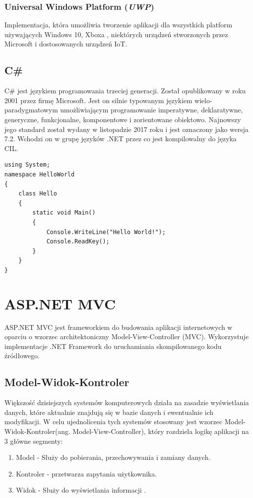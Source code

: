 \subsection{Universal Windows Platform (\textit{UWP})}
Implementacja, która umożliwia tworzenie aplikacji dla wszystkich platform używających Windows 10, Xboxa , niektórych urządzeń stworzonych przez Microsoft i dostosowanych urządzeń IoT.


\section{C\#}

C\# jest językiem programowania trzeciej generacji. Został opublikowany w roku 2001 przez firmę Microsoft. Jest on silnie typowanym językiem wielo-paradygmatowym umożliwiającym programowanie imperatywne, deklaratywne, generyczne, funkcjonalne, komponentowe i zorientowane obiektowo. Najnowszy jego standard został wydany w listopadzie 2017 roku i jest oznaczony jako wersja 7.2. Wchodzi on w grupę języków .NET przez co jest kompilowalny do języka CIL. \cite{CPlotekInfo}
\begin{minipage}{\linewidth}
\begin{lstlisting}[frame=single, numbers=none,captionpos=b, 
caption={Przykładowy kod aplikacji "Hello World" w języku CIL}]
using System;
namespace HelloWorld
{
    class Hello 
    {
        static void Main() 
        {
            Console.WriteLine("Hello World!");
            Console.ReadKey();
        }
    }
}
\end{lstlisting}
\end{minipage}
\newpage
{\let\cleardoublepage\relax \chapter{ASP.NET MVC}}


ASP.NET MVC jest frameworkiem do budowania aplikacji internetowych w oparciu o wzorzec architektoniczny Model-View-Controller (MVC). Wykorzystuje implementacje .NET Framework do uruchamiania skompilowanego kodu źródłowego.


\section{Model-Widok-Kontroler}

Większość dzisiejszych systemów komputerowych działa na zasadzie wyświetlania danych, które aktualnie znajdują się w bazie danych i ewentualnie ich modyfikacji. W celu ujednolicenia tych systemów stosowany jest wzorzec Model-Widok-Kontroler(ang. Model-View-Controller), który rozdziela logikę aplikacji na 3 główne segmenty:
\begin{enumerate}
	\item Model - Służy do pobierania, przechowywania i zamiany danych.
	\item Kontroler - przetwarza zapytania użytkownika.
	\item Widok - Służy do wyświetlania informacji .
\end{enumerate}

